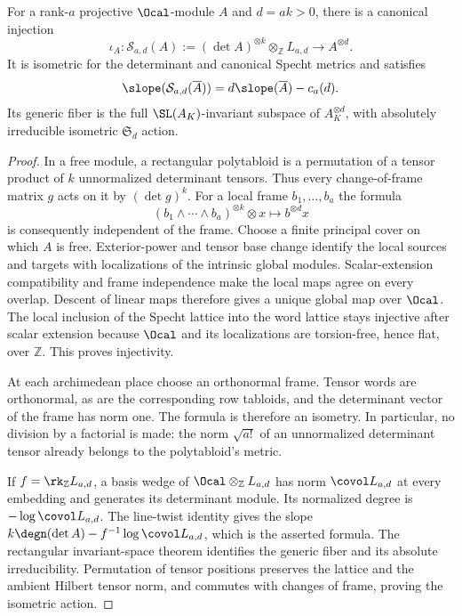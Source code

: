 \begin{lemma}
\label{lem:determinant-isotypic}
\notready
For a rank-$a$ projective $\Ocal$-module $A$ and $d=ak>0$, there is
a canonical injection
\[
 \iota_A:\mathcal S_{a,d}(A):=
 (\det A)^{\otimes k}\otimes_\mathbb Z L_{a,d}\longrightarrow A^{\otimes d}.
\]
It is isometric for the determinant and canonical Specht metrics and
satisfies
\[
 \slope(\mathcal S_{a,d}(\overline A))=d\slope(\overline A)-c_a(d).
\]
Its generic fiber is the full $\SL(A_K)$-invariant subspace of
$A_K^{\otimes d}$, with absolutely irreducible isometric $\mathfrak S_d$
action.
\end{lemma}
\begin{proof}
In a free module, a rectangular polytabloid is a permutation of a
tensor product of $k$ unnormalized determinant tensors. Thus every
change-of-frame matrix $g$ acts on it by $(\det g)^k$. For a local
frame $b_1,\ldots,b_a$ the formula
\[
 (b_1\wedge\cdots\wedge b_a)^{\otimes k}\otimes x
 \longmapsto b^{\otimes d}x
\]
is consequently independent of the frame. Choose a finite principal
cover on which $A$ is free. Exterior-power and tensor base change
identify the local sources and targets with localizations of the
intrinsic global modules. Scalar-extension compatibility and frame
independence make the local maps agree on every overlap. Descent of
linear maps therefore gives a unique global map over $\Ocal$.
The local inclusion of the Specht lattice into the word lattice stays
injective after scalar extension because $\Ocal$ and its localizations
are torsion-free, hence flat, over $\mathbb Z$. This proves injectivity.

At each archimedean place choose an orthonormal frame. Tensor words are
orthonormal, as are the corresponding row tabloids, and the determinant
vector of the frame has norm one. The formula is therefore an isometry.
In particular, no division by a factorial is made: the norm
$\sqrt{a!}$ of an unnormalized determinant tensor already belongs to
the polytabloid's metric.

If $f=\rk_\mathbb Z L_{a,d}$, a basis wedge of
$\Ocal\otimes_\mathbb Z L_{a,d}$ has norm $\covol L_{a,d}$ at every
embedding and generates its determinant module. Its normalized degree
is $-\log\covol L_{a,d}$. The line-twist identity gives the slope
$k\degn(\det A)-f^{-1}\log\covol L_{a,d}$, which is the asserted
formula. The rectangular invariant-space theorem identifies the
generic fiber and its absolute irreducibility. Permutation of tensor
positions preserves the lattice and the ambient Hilbert tensor norm,
and commutes with changes of frame, proving the isometric action.
\end{proof}

